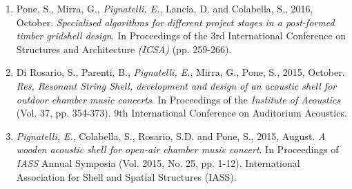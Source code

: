 \begin{enumerate}[leftmargin=0.45cm, itemsep=0em, topsep=0.5em, parsep=0.2em]
    \item Pone, S., Mirra, G., \emph{Pignatelli, E.}, Lancia, D. and Colabella, S., 2016, October. \textit{Specialised algorithms for different project stages in a post-formed timber gridshell design}. In Proceedings of the 3rd International Conference on Structures and Architecture \emph{(ICSA)} (pp. 259-266).
    \item Di Rosario, S., Parenti, B., \emph{Pignatelli, E.}, Mirra, G., Pone, S., 2015, October. \textit{Res, Resonant String Shell, development and design of an acoustic shell for outdoor chamber music concerts}. In Proceedings of the \emph{Institute of Acoustics} (Vol. 37, pp. 354-373). 9th International Conference on Auditorium Acoustics.
    \item \emph{Pignatelli, E.}, Colabella, S., Rosario, S.D. and Pone, S., 2015, August. \textit{A wooden acoustic shell for open-air chamber music concert}. In Proceedings of \emph{IASS} Annual Symposia (Vol. 2015, No. 25, pp. 1-12). International Association for Shell and Spatial Structures (IASS).
\end{enumerate}